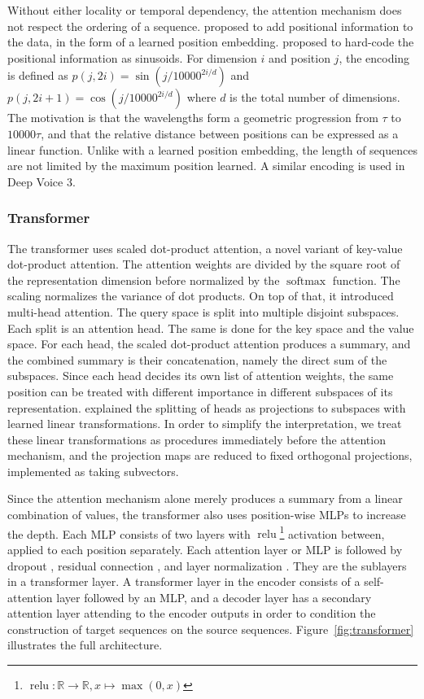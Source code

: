 \documentclass[11pt]{article}
\DeclareMathOperator{\softmax}{softmax}
\DeclareMathOperator{\relu}{relu}
\begin{document}
Without either locality or temporal dependency,
the attention mechanism does not respect the ordering of a sequence.
\textcite{gehring2017convolutional} proposed to add positional information to the data,
in the form of a learned position embedding.
\textcite{vaswani2017attention} proposed to hard-code the positional information as sinusoids.
For dimension \(i\) and position \(j\), the encoding is defined as
\(p(j, 2i) = \sin \left( j / 10000^{2i/d} \right)\) and
\(p(j, 2i+1) = \cos \left( j / 10000^{2i/d} \right)\)
where \(d\) is the total number of dimensions.
The motivation is that the wavelengths form a geometric progression from \(\tau\) to \(10000 \tau\),
and that the relative distance between positions can be expressed as a linear function.
Unlike with a learned position embedding,
the length of sequences are not limited by the maximum position learned.
A similar encoding is used in Deep Voice 3.

\subsubsection*{Transformer}

The transformer uses scaled dot-product attention,
a novel variant of key-value dot-product attention.
The attention weights are divided by the square root of the representation dimension
before normalized by the \(\softmax\) function.
The scaling normalizes the variance of dot products.
On top of that, it introduced multi-head attention.
The query space is split into multiple disjoint subspaces.
Each split is an attention head.
The same is done for the key space and the value space.
For each head, the scaled dot-product attention produces a summary,
and the combined summary is their concatenation,
namely the direct sum of the subspaces.
Since each head decides its own list of attention weights,
the same position can be treated with different importance in different subspaces of its representation.
\textcite{vaswani2017attention} explained the splitting of heads
as projections to subspaces with learned linear transformations.
In order to simplify the interpretation,
we treat these linear transformations as procedures immediately before the attention mechanism,
and the projection maps are reduced to fixed orthogonal projections,
implemented as taking subvectors.

Since the attention mechanism alone merely produces a summary from a linear combination of values,
the transformer also uses position-wise MLPs to increase the depth.
Each MLP consists of two layers with
\(\relu\)\footnote{\(\relu : \mathbb{R} \to \mathbb{R}, x \mapsto \max(0, x)\)} activation between,
applied to each position separately.
Each attention layer or MLP is followed by dropout \parencite{srivastava2014dropout},
residual connection \parencite{he2016deep}, and layer normalization \parencite{ba2016layer}.
They are the sublayers in a transformer layer.
A transformer layer in the encoder consists of a self-attention layer followed by an MLP,
and a decoder layer has a secondary attention layer attending to the encoder outputs
in order to condition the construction of target sequences on the source sequences.
Figure~\ref{fig:transformer} illustrates the full architecture.
\end{document}
